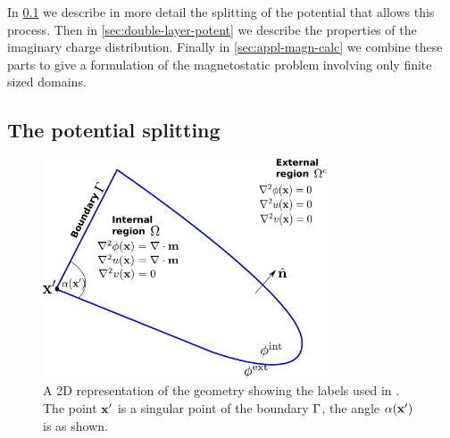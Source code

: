 In \cref{sec:problem-description} we describe in more detail the splitting of the potential that allows this process.
Then in \cref{sec:double-layer-potent} we describe the properties of the imaginary charge distribution.
Finally in \cref{sec:appl-magn-calc} we combine these parts to give a formulation of the magnetostatic problem involving only finite sized domains.

\subsection{The potential splitting}
\label{sec:problem-description}
\newcommand{\examplepot}{f}

\begin{figure}
  \center
  \includegraphics[width=0.75\textwidth]{./images/BEM-geometry}




  \caption{A 2D representation of the geometry showing the labels used in .
    The point $\boldsymbol{\mathrm{x}}'$ is a singular point of the boundary ${\Gamma}$, the angle $\alpha(\boldsymbol{\mathrm{x}}')$ is as shown.}
  \label{fig:BEM-geometry}
\end{figure}

